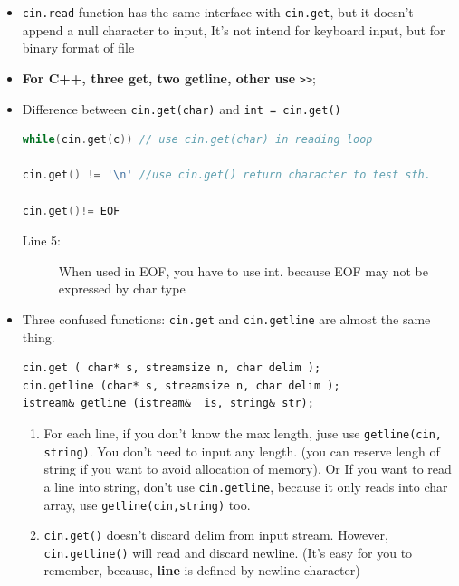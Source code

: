 \documentclass[a4paper,11pt,twoside]{book}
\begin{document}
\begin{itemize}
\begin{lstlisting}[frame=single, language=c++]
gets(char_array)  //c read a line	
fgets(char_array, n , FILE *) //recommend to use this for safety.
	
cin.getline(char * ,int n) // c++ read and discard newline
cin.get(char * ,int n)  
std::getline(istream&  is, string& str)
	\end{lstlisting}
	
	\item \texttt{cin.read} function has the same interface with \texttt{cin.get}, but it doesn't append a null character to input, It's not intend for keyboard input, but for binary format of file
	
	\item \textbf{For C++, three get, two getline, other use} \verb|>>|;
	
	\item Difference between \texttt{cin.get(char)} and \texttt{int = cin.get()}
\begin{lstlisting}[frame=single, language=c++]
while(cin.get(c)) // use cin.get(char) in reading loop

cin.get() != '\n' //use cin.get() return character to test sth.
	
cin.get()!= EOF
\end{lstlisting}
\begin{description}
	\item[Line 5:] When used in EOF, you have to use int. because EOF may not be expressed by char type
\end{description}
	
	\item Three confused functions: \texttt{cin.get} and \texttt{cin.getline} are almost the same thing.
\begin{lstlisting}[numbers=none]
cin.get ( char* s, streamsize n, char delim );
cin.getline (char* s, streamsize n, char delim );
istream& getline (istream&  is, string& str);
\end{lstlisting}
	
	\begin{enumerate}
		
		\item For each line, if you don't know the max length, juse use \texttt{getline(cin, string)}. You don't need to input any length. (you can reserve lengh of string if you want to avoid allocation of memory). Or If you want to read a line into string, don't use \texttt{cin.getline}, because it only reads into char array, use \texttt{getline(cin,string)} too.
		
		\item \texttt{cin.get()} doesn't discard delim from input stream. However, \texttt{cin.getline()} will read and discard newline.  (It's easy for you to remember, because, \textbf{line} is defined by newline character)
		

\end{enumerate}
\end{itemize}
\end{document}

